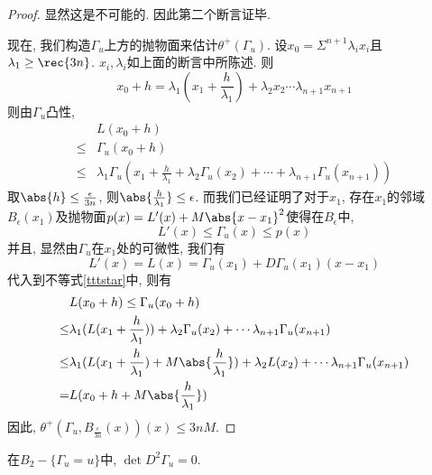 \begin{proof}
    显然这是不可能的.  因此第二个断言证毕.  
    \par 现在, 我们构造$\Gamma_u$上方的抛物面来估计$\theta^+(\Gamma_u)$.  设$x_0 =\Sigma^{n+1}\lambda_i x_i$且$\lambda_1 \ge \rec{3n}$.  $x_i, \lambda_i$如上面的断言中所陈述.  则
    \begin{equation}
        x_0+h=\lambda_1(x_1+\frac{h}{\lambda_1}) + \lambda_2 x_2 \cdots \lambda_{n+1}x_{n+1}
    \end{equation}
    则由$\Gamma_u$凸性, 
    \begin{equation} \label{tttstar}
        \begin{split}
            &L(x_0+h)  \\
            \le & \Gamma_u(x_0+h) \\
            \le & \lambda_1\Gamma_u(x_1+\frac{h}{\lambda_1}+\lambda_2\Gamma_u(x_2)+\cdots+\lambda_{n+1}\Gamma_u(x_{n+1}))
        \end{split}
    \end{equation}
    取$\abs{h} \le \frac{\epsilon}{3n}$, 则$\abs{\frac{h}{\lambda_1}} \le \epsilon$.  而我们已经证明了对于$x_1$, 存在$x_1$的邻域$B_\epsilon(x_1)$及抛物面$p(x)=L'(x)+M\abs{x-x_1}^2$使得在$B_\epsilon$中, 
    \begin{equation}
        L'(x) \le \Gamma_u(x) \le p(x)
    \end{equation}
    并且, 显然由$\Gamma_u$在$x_1$处的可微性, 我们有 
    \begin{equation}
        L'(x)=L(x)=\Gamma_u(x_1)+D\Gamma_u(x_1)(x-x_1)
    \end{equation}
    代入到不等式\eqref{tttstar}中, 则有
    \begin{equation}
        \begin{split}
            &L(x_0+h) \le \Gamma_u(x_0+h)  \\
            \le & \lambda_1(L(x_1+\frac{h}{\lambda_1}))+\lambda_2\Gamma_u(x_2)+\cdots \lambda_{n+1}\Gamma_u(x_{n+1}) \\ 
            \le & \lambda_1(L(x_1+\frac{h}{\lambda_1})+M\abs{\frac{h}{\lambda_1}})+\lambda_2L(x_2)+\cdots \lambda_{n+1}\Gamma_u(x_{n+1}) \\
            =& L(x_0+h+M\abs{\frac{h}{\lambda_1}})
        \end{split}
    \end{equation}
    因此, $\theta^+(\Gamma_u, B_{\frac{\epsilon}{3n}}(x))(x) \le 3nM$.  
\end{proof}
\begin{corollary} \label{d2gammau_0}
    在$B_2-\{\Gamma_u=u\}$中, $\det D^2\Gamma_u=0$.  
\end{corollary}
